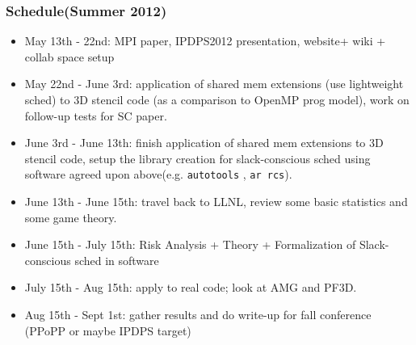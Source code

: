 \begin{frame}
\frametitle{Schedule(Summer 2012)}
\begin{itemize}

\tiny \item \tiny May 13th - 22nd:  MPI paper, IPDPS2012 presentation, website+ wiki + collab space setup \\  

\item \tiny May 22nd - June 3rd: application of shared mem extensions (use lightweight sched) 
to 3D stencil code (as a comparison to OpenMP prog model), work on follow-up tests for SC paper. 

\item \tiny June 3rd - June 13th: finish application of shared mem extensions to 3D stencil code,  
setup the library creation for slack-conscious sched using software agreed upon above(e.g.
\texttt{autotools} , \texttt{ar rcs}).  \\  

\item \tiny June 13th - June 15th: travel back to LLNL, review some basic statistics and some game theory. \\  

\item \tiny June 15th - July 15th: Risk Analysis + Theory + Formalization of Slack-conscious sched in software \\ 

\item \tiny July 15th - Aug 15th: apply to real code; look at AMG and PF3D. \\ 

\item \tiny Aug 15th - Sept 1st: gather results and do write-up for fall conference (PPoPP or maybe IPDPS target) \\ 

\end{itemize} 
\end{frame} 

